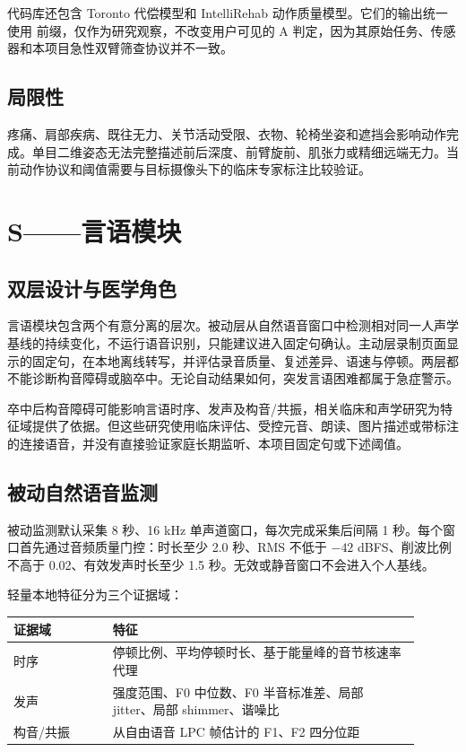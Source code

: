 \documentclass[11pt,a4paper]{article}
\begin{document}
代码库还包含 Toronto 代偿模型和 IntelliRehab 动作质量模型。它们的输出统一使用  前缀，仅作为研究观察，不改变用户可见的 A 判定，因为其原始任务、传感器和本项目急性双臂筛查协议并不一致。

\subsection{局限性}

疼痛、肩部疾病、既往无力、关节活动受限、衣物、轮椅坐姿和遮挡会影响动作完成。单目二维姿态无法完整描述前后深度、前臂旋前、肌张力或精细远端无力。当前动作协议和阈值需要与目标摄像头下的临床专家标注比较验证。

\section{S——言语模块}

\subsection{双层设计与医学角色}

言语模块包含两个有意分离的层次。被动层从自然语音窗口中检测相对同一人声学基线的持续变化，不运行语音识别，只能建议进入固定句确认。主动层录制页面显示的固定句，在本地离线转写，并评估录音质量、复述差异、语速与停顿。两层都不能诊断构音障碍或脑卒中。无论自动结果如何，突发言语困难都属于急症警示。

卒中后构音障碍可能影响言语时序、发声及构音/共振，相关临床和声学研究为特征域提供了依据\cite{decock2021acute,kim2011acoustic,mou2018mandarin,ge2021vowels,wong2022tdcs,sanguedolce2025stroke,jyothi2026stroke}。但这些研究使用临床评估、受控元音、朗读、图片描述或带标注的连接语音，并没有直接验证家庭长期监听、本项目固定句或下述阈值。

\subsection{被动自然语音监测}

被动监测默认采集 8 秒、16 kHz 单声道窗口，每次完成采集后间隔 1 秒。每个窗口首先通过音频质量门控：时长至少 2.0 秒、RMS 不低于 $-42$ dBFS、削波比例不高于 0.02、有效发声时长至少 1.5 秒。无效或静音窗口不会进入个人基线。

轻量本地特征分为三个证据域：

\begin{longtable}{p{0.22\linewidth}p{0.68\linewidth}}
\toprule
证据域 & 特征 \\
\midrule
时序 & 停顿比例、平均停顿时长、基于能量峰的音节核速率代理 \\
发声 & 强度范围、F0 中位数、F0 半音标准差、局部 jitter、局部 shimmer、谐噪比 \\
构音/共振 & 从自由语音 LPC 帧估计的 F1、F2 四分位距 \\
\bottomrule
\end{longtable}
\end{document}
